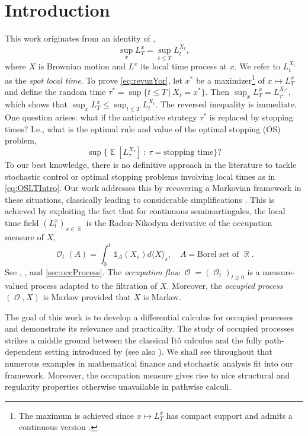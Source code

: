 \documentclass[11pt]{article}
\theoremstyle{plain}
\theoremstyle{definition}
\DeclareMathOperator{\E}{\mathbb{E}}
\DeclareMathOperator{\R}{\mathbb{R}}
\DeclareMathOperator{\calO}{\mathcal{O}}
\begin{document}
\newpage 

\section{Introduction}
This work  originates from an   identity  of \citet[Chapter VI]{RevuzYor}, 
\begin{equation}\label{eq:revuzYor}
    \sup_x L^x_T = \sup_{t\le T} L_t^{X_t}, 
\end{equation}
where $X$ is  Brownian motion and $L^x$ its local time process at $x$.   
We refer to $L_t^{X_t}$  as the \textit{spot local time}. 
To prove \eqref{eq:revuzYor}, let $x^*$ be a maximizer\footnote{The maximum is achieved since $x \mapsto  L_T^x$ has compact support and  admits a continuous version  \cite[Chapter VI]{RevuzYor}.} of  $x\mapsto L^x_T 
$   and define the random time $\tau^* = \sup\{t\le T \ | \ X_t = x^*\}$. Then $\sup_x L^x_T =  L_{\tau^*}^{X_{\tau^*}}$, which shows that $\sup_x L^x_T \le \sup_{t\le T} L_t^{X_t}$. The reversed inequality is immediate.  
One question arises: 
what if 
the anticipative strategy $\tau^*$ is replaced by stopping times?
I.e., what is the  optimal rule and value of the optimal stopping (OS)  problem, 
\begin{equation}\label{eq:OSLTIntro}
    \sup\{ \E[L_\tau^{X_\tau}] \ : \ \tau = \text{stopping time}\}?
\end{equation}
To our best knowledge, there is no  definitive approach in the literature to tackle stochastic control  or optimal stopping  problems involving local times as in \eqref{eq:OSLTIntro}. 
Our work addresses this by recovering a Markovian framework in these situations, classically leading  to considerable simplifications \cite{FlemingSoner,PeskirShiryaev}.  
This is achieved by exploiting the  fact that for continuous semimartingales, the local time field $(L_t^x)_{x\in \R}$ 
is 
the Radon-Nikodym derivative of the occupation measure of $X$,
\begin{equation}\label{eq:occMeasureIntro}
    \calO_t(A) = \int_0^t \mathds{1}_{A}(X_s)d\langle X \rangle_s, \quad A= \text{Borel set of } \R.  
\end{equation}
See \cite{GemanHorowitz}, \cite[Chapter VI]{RevuzYor}, and \cref{sec:occProcess}.  
The \textit{occupation flow} $\calO = (\calO_t)_{t\ge 0}$ is a measure-valued process adapted to the filtration of $X$. 
Moreover,  the \textit{occupied process} $(\calO,X)$ is Markov provided that $X$  is  Markov. 

The goal of this work is to develop a  differential calculus for occupied processes and demonstrate its relevance and practicality. 
The study of occupied processes strikes a middle ground  between the classical Itô calculus and the fully path-dependent setting introduced by  \citet{DupireFITO} (see also \cite{ContBally, ContFournie}).  
We shall see throughout that numerous 
examples in mathematical finance and  stochastic analysis   fit 
into our framework. 
Moreover, the occupation measure gives rise to  nice structural and regularity properties otherwise  unavailable in  pathwise calculi.
\end{document}
